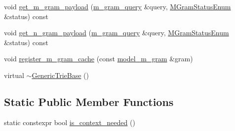 \begin{DoxyCompactItemize}
\item 
void \hyperlink{classuva_1_1smt_1_1bpbd_1_1server_1_1lm_1_1_generic_trie_base_acd1e30f2b0743a71fb5bd652c997be5d}{get\+\_\+m\+\_\+gram\+\_\+payload} (\hyperlink{classuva_1_1smt_1_1bpbd_1_1server_1_1lm_1_1m__gram__query}{m\+\_\+gram\+\_\+query} \&query, \hyperlink{namespaceuva_1_1smt_1_1bpbd_1_1server_1_1lm_ab9b3e7382b561dcb8abcd6b55e9b796a}{M\+Gram\+Status\+Enum} \&status) const 
\item 
void \hyperlink{classuva_1_1smt_1_1bpbd_1_1server_1_1lm_1_1_generic_trie_base_aa915d6e3e059972fbecbe0af7769a78d}{get\+\_\+n\+\_\+gram\+\_\+payload} (\hyperlink{classuva_1_1smt_1_1bpbd_1_1server_1_1lm_1_1m__gram__query}{m\+\_\+gram\+\_\+query} \&query, \hyperlink{namespaceuva_1_1smt_1_1bpbd_1_1server_1_1lm_ab9b3e7382b561dcb8abcd6b55e9b796a}{M\+Gram\+Status\+Enum} \&status) const 
\item 
void \hyperlink{classuva_1_1smt_1_1bpbd_1_1server_1_1lm_1_1_generic_trie_base_acb48e357c779bd62ffd9a45613c46463}{register\+\_\+m\+\_\+gram\+\_\+cache} (const \hyperlink{classuva_1_1smt_1_1bpbd_1_1server_1_1lm_1_1m__grams_1_1model__m__gram}{model\+\_\+m\+\_\+gram} \&gram)
\item 
virtual \hyperlink{classuva_1_1smt_1_1bpbd_1_1server_1_1lm_1_1_generic_trie_base_a2fe36e7ea7ae3376d87065bce4ab0c30}{$\sim$\+Generic\+Trie\+Base} ()
\end{DoxyCompactItemize}
\subsection*{Static Public Member Functions}
\begin{DoxyCompactItemize}
\item 
static constexpr bool \hyperlink{classuva_1_1smt_1_1bpbd_1_1server_1_1lm_1_1_generic_trie_base_a7a1f0129818a340baf6d82e49dea5e06}{is\+\_\+context\+\_\+needed} ()
\end{DoxyCompactItemize}

